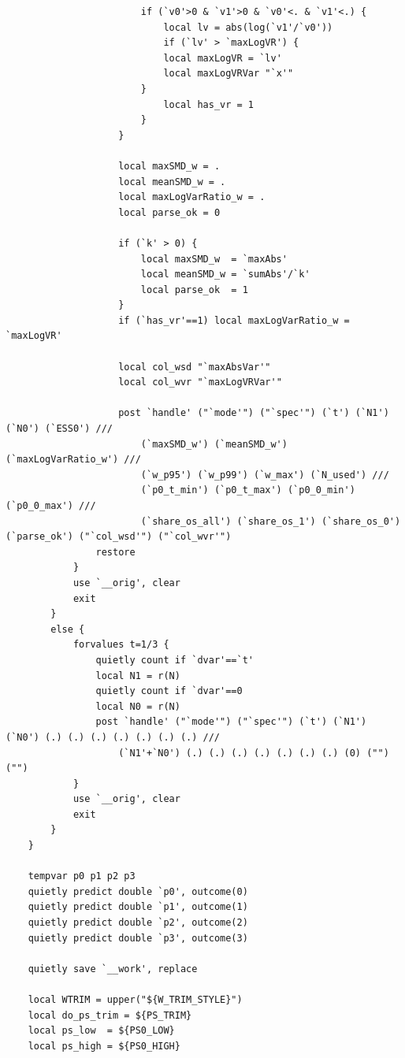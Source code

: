 \documentclass[12pt]{article}
\begin{document}
\begin{lstlisting}
                        if (`v0'>0 & `v1'>0 & `v0'<. & `v1'<.) {
                            local lv = abs(log(`v1'/`v0'))
                            if (`lv' > `maxLogVR') {
                            local maxLogVR = `lv'
                            local maxLogVRVar "`x'"
                        }
                            local has_vr = 1
                        }
                    }

                    local maxSMD_w = .
                    local meanSMD_w = .
                    local maxLogVarRatio_w = .
                    local parse_ok = 0

                    if (`k' > 0) {
                        local maxSMD_w  = `maxAbs'
                        local meanSMD_w = `sumAbs'/`k'
                        local parse_ok  = 1
                    }
                    if (`has_vr'==1) local maxLogVarRatio_w = `maxLogVR'

                    local col_wsd "`maxAbsVar'"
                    local col_wvr "`maxLogVRVar'"

                    post `handle' ("`mode'") ("`spec'") (`t') (`N1') (`N0') (`ESS0') ///
                        (`maxSMD_w') (`meanSMD_w') (`maxLogVarRatio_w') ///
                        (`w_p95') (`w_p99') (`w_max') (`N_used') ///
                        (`p0_t_min') (`p0_t_max') (`p0_0_min') (`p0_0_max') ///
                        (`share_os_all') (`share_os_1') (`share_os_0') (`parse_ok') ("`col_wsd'") ("`col_wvr'")
                restore
            }
            use `__orig', clear
            exit
        }
        else {
            forvalues t=1/3 {
                quietly count if `dvar'==`t'
                local N1 = r(N)
                quietly count if `dvar'==0
                local N0 = r(N)
                post `handle' ("`mode'") ("`spec'") (`t') (`N1') (`N0') (.) (.) (.) (.) (.) (.) (.) ///
                    (`N1'+`N0') (.) (.) (.) (.) (.) (.) (.) (0) ("") ("")
            }
            use `__orig', clear
            exit
        }
    }

    tempvar p0 p1 p2 p3
    quietly predict double `p0', outcome(0)
    quietly predict double `p1', outcome(1)
    quietly predict double `p2', outcome(2)
    quietly predict double `p3', outcome(3)

    quietly save `__work', replace

    local WTRIM = upper("${W_TRIM_STYLE}")
    local do_ps_trim = ${PS_TRIM}
    local ps_low  = ${PS0_LOW}
    local ps_high = ${PS0_HIGH}


\end{lstlisting}
\end{document}
